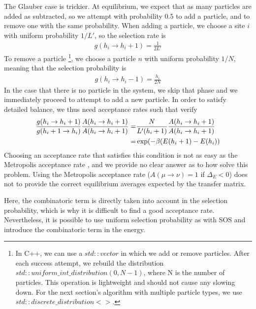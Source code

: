 The Glauber case is trickier. At equilibrium, we expect that as many particles are added as subtracted, so we attempt with probability $0.5$ to add a particle, and to remove one with the same probability. When adding a particle, we choose a site $i$ with uniform probability $1/L'$, so the selection rate is 
\begin{align}
g(h_i \to h_i+1) = \frac{1}{2L'}
\end{align}
To remove a particle \footnote{In C++, we can use a $std::vector$ in which we add or remove particles. After each success attempt, we rebuild the distribution $std::uniform\_int\_distribution(0,N-1)$, where N is the number of particles. This operation is lightweight and should not cause any slowing down. For the next section's algorithm with multiple particle types, we use $std::discrete\_distribution<>$. }, we choose a particle $n$ with uniform probability $1/N$, meaning that the selection probability is 
\begin{align}
g(h_i \to h_i-1) = \frac{h_i}{2N}
\end{align}
In the case that there is no particle in the system, we skip that phase and we immediately proceed to attempt to add a new particle.
In order to satisfy detailed balance, we thus need acceptance rates such that verify
\begin{align}
\frac{g(h_i \to h_i+1)}{g(h_i+1 \to h_i)} \frac{A(h_i \to h_i+1)}{A(h_i \to h_i+1)}
=& \frac{N}{L' (h_i+1)} \frac{A(h_i \to h_i+1)}{A(h_i \to h_i+1)} \nonumber \\
=& \exp(-\beta (E(h_i+1)-E(h_i)) 
\end{align}
Choosing an acceptance rate that satisfies this condition is not as easy as the Metropolis acceptance rate \cite{metropolis_monte_1949}, and we provide no clear answer as to how solve this problem. Using the Metropolis acceptance rate ($A(\mu \to \nu) = 1$ if $\Delta_E < 0$) does not to provide the correct equilibrium averages expected by the transfer matrix.

Here, the combinatoric term is directly taken into account in the selection probability, which is why it is difficult to find a good acceptance rate. Nevertheless, it is possible to use uniform selection probability as with SOS and introduce the combinatoric term in the energy. 

